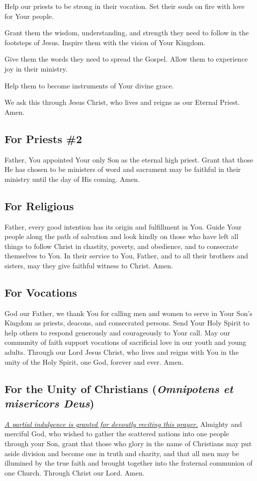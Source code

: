 \documentclass[12pt]{article}
\newcommand{\prayertitle}[1]{\subsection{#1}}
\newcommand{\indulgencedprayertitle}[1]{\prayertitle{#1 \protect\kreuz}}
\newcommand{\foreign}[1]{\textsl{#1}}
\newcommand{\note}[1]{{\small{\textsl{#1}}}\newline}
\newcommand{\linkednote}[2]{\hyperlink{#1}{\note{#2}}}
\begin{document}
Help our priests to be strong in their vocation.
Set their souls on fire with love for Your people.

Grant them the wisdom, understanding, and strength they need to follow in the footsteps of Jesus.
Inspire them with the vision of Your Kingdom.

Give them the words they need to spread the Gospel.
Allow them to experience joy in their ministry.

Help them to become instruments of Your divine grace.

We ask this through Jesus Christ, who lives and reigns as our Eternal Priest.
Amen.

\prayertitle{For Priests \#2}
Father, You appointed Your only Son as the eternal high priest.
Grant that those He has chosen to be ministers of word and sacrament may be faithful in their ministry until the day of His coming.
Amen.

\prayertitle{For Religious}
Father, every good intention has its origin and fulfillment in You.
Guide Your people along the path of salvation and look kindly on those who have left all things to follow Christ in chastity, poverty, and obedience, and to consecrate themselves to You.
In their service to You, Father, and to all their brothers and sisters, may they give faithful witness to Christ.
Amen.

\prayertitle{For Vocations}
God our Father, we thank You for calling men and women to serve in Your Son’s Kingdom as priests, deacons, and consecrated persons.
Send Your Holy Spirit to help others to respond generously and courageously to Your call.
May our community of faith support vocations of sacrificial love in our youth and young adults.
Through our Lord Jesus Christ, who lives and reigns with You in the unity of the Holy
Spirit, one God, forever and ever.
Amen.

\indulgencedprayertitle{For the Unity of Christians (\foreign{Omnipotens et misericors Deus})}
\linkednote{grant11}{A partial indulgence is granted for devoutly reciting this prayer.}
Almighty and merciful God, who wished to gather the scattered nations into one people
through your Son, grant that those who glory in the name of Christians may put aside
division and become one in truth and charity, and that all men may be illumined by the
true faith and brought together into the fraternal communion of one Church.
Through Christ our Lord. Amen.
\end{document}
